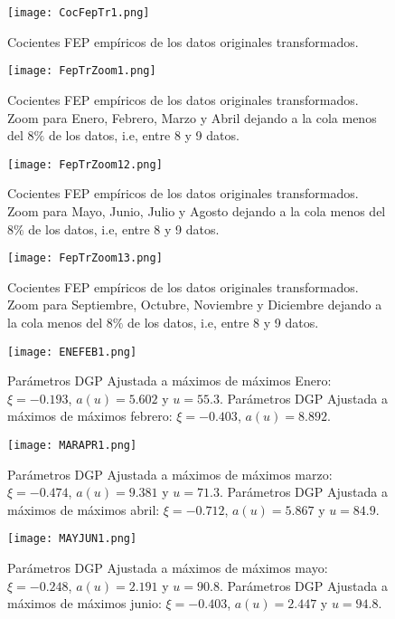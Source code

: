 \documentclass[10.5pt,notitlepage]{article}
\theoremstyle{plain}
\begin{document}
\begin{figure}[htb]
    \centering
    \texttt{[image: CocFepTr1.png]}
    \caption{Cocientes FEP empíricos de los datos originales transformados.}
    \label{fig:6}
\end{figure}

\begin{figure}[htb]
    \centering
    \texttt{[image: FepTrZoom1.png]}
    \caption{Cocientes FEP empíricos de los datos originales transformados. Zoom para Enero, Febrero, Marzo y Abril dejando a la cola menos del \(8\%\) de los datos, i.e, entre 8 y 9 datos.}
    \label{fig:6.1}
\end{figure}

\begin{figure}[htb]
    \centering
    \texttt{[image: FepTrZoom12.png]}
    \caption{Cocientes FEP empíricos de los datos originales transformados. Zoom para Mayo, Junio, Julio y Agosto dejando a la cola menos del \(8\%\) de los datos, i.e, entre 8 y 9 datos.}
    \label{fig:6.2}
\end{figure}

\begin{figure}[htb]
    \centering
    \texttt{[image: FepTrZoom13.png]}
    \caption{Cocientes FEP empíricos de los datos originales transformados. Zoom para Septiembre, Octubre, Noviembre y Diciembre dejando a la cola menos del \(8\%\) de los datos, i.e, entre 8 y 9 datos.}
    \label{fig:6.3}
\end{figure}

\begin{figure}[htb]
    \centering
    \texttt{[image: ENEFEB1.png]}
    \caption{Parámetros DGP Ajustada a máximos de máximos Enero: \(\xi = -0.193\), \(a(u)=5.602\) y \(u = 55.3\). Parámetros DGP Ajustada a máximos de máximos febrero: \(\xi = -0.403\), \(a(u)=8.892\).}
    \label{fig:7}
\end{figure}

\begin{figure}[htb]
    \centering
    \texttt{[image: MARAPR1.png]}
    \caption{Parámetros DGP Ajustada a máximos de máximos marzo: \(\xi =-0.474 \), \(a(u)=9.381\) y \(u = 71.3\). Parámetros DGP Ajustada a máximos de máximos abril: \(\xi = -0.712\), \(a(u)=  5.867\) y \(u = 84.9\).}
    \label{fig:8}
\end{figure}

\begin{figure}[htb]
    \centering
    \texttt{[image: MAYJUN1.png]}
    \caption{Parámetros DGP Ajustada a máximos de máximos mayo: \(\xi = -0.248\), \(a(u)=2.191\) y \(u = 90.8\). Parámetros DGP Ajustada a máximos de máximos junio: \(\xi =-0.403\), \(a(u)=2.447\) y \(u = 94.8\).}
    \label{fig:9} 
\end{figure} 
\end{document}
